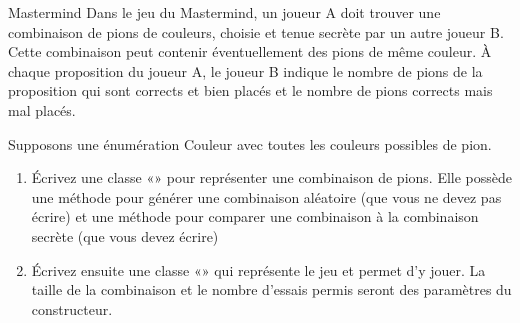 \begin{Exercice}{Mastermind}
	Dans le jeu du Mastermind, un joueur A doit
	trouver une combinaison de
	 pions de couleurs, choisie et tenue secrète
	par un autre joueur B. Cette combinaison peut contenir éventuellement
	des pions de même couleur. À chaque proposition du joueur A, le joueur
	B indique le nombre de pions de la proposition qui sont corrects et
	bien placés et le nombre de pions corrects mais mal placés. 

	Supposons une énumération Couleur avec toutes les couleurs possibles de
	pion.

	\begin{enumerate}[label=\alph*)]
		\item
			Écrivez une classe «» pour
			représenter une combinaison de  pions. Elle
			possède une méthode pour générer une combinaison aléatoire (que vous ne
			devez pas écrire) et une méthode pour comparer une combinaison à la
			combinaison secrète (que vous devez écrire)
		\item
			Écrivez ensuite une classe «» qui
			représente le jeu et permet d’y jouer. La taille de la combinaison et
			le nombre d’essais permis seront des paramètres du constructeur.
	\end{enumerate}
\end{Exercice}

